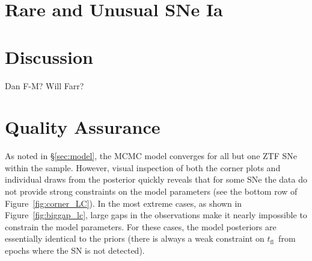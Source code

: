 \documentclass[twocolumn]{./aastex63}
\newcommand{\tfl}{$t_\mathrm{fl}$}
\begin{document}
\section{Rare and Unusual SNe Ia}

\section{Discussion}


\acknowledgements

Dan F-M? Will Farr?



\appendix

\section{Quality Assurance}\label{sec:qa}

As noted in \S\ref{sec:model}, the MCMC model converges for all but one ZTF
SNe within the sample. However, visual inspection of both the corner plots and
individual draws from the posterior quickly reveals that for some SNe the data
do not provide strong constraints on the model parameters (see the bottom row
of Figure~\ref{fig:corner_LC}). In the most extreme cases, as shown in
Figure~\ref{fig:biggap_lc}, large gaps in the observations make it nearly
impossible to constrain the model parameters. For these cases, the model
posteriors are essentially identical to the priors (there is always a weak
constraint on \tfl\ from epochs where the SN is not detected).
\end{document}
